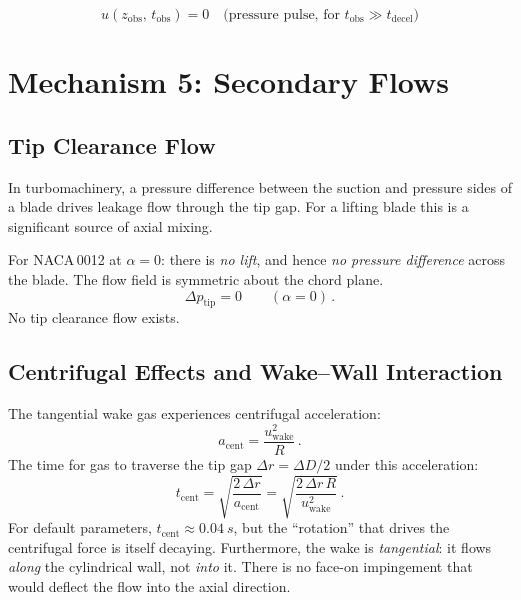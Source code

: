 \documentclass[11pt,a4paper]{article}
\begin{document}
\begin{equation}
  \boxed{u(z_\mathrm{obs},\, t_\mathrm{obs})
    = 0 \quad \text{(pressure pulse, for }
    t_\mathrm{obs} \gg t_\mathrm{decel}\text{)}}
\end{equation}


\section{Mechanism 5: Secondary Flows}
\label{sec:secondary}

\subsection{Tip Clearance Flow}

In turbomachinery, a pressure difference between the suction and
pressure sides of a blade drives leakage flow through the tip gap. For
a lifting blade this is a significant source of axial mixing.

For NACA\,0012 at $\alpha = 0$: there is \emph{no lift}, and hence
\emph{no pressure difference} across the blade. The flow field is
symmetric about the chord plane.
\begin{equation}
  \Delta p_\mathrm{tip} = 0 \qquad (\alpha = 0)\,.
\end{equation}
No tip clearance flow exists.

\subsection{Centrifugal Effects and Wake--Wall Interaction}

The tangential wake gas experiences centrifugal acceleration:
\begin{equation}
  a_\mathrm{cent} = \frac{u_\mathrm{wake}^2}{R}\,.
  \label{eq:acent}
\end{equation}
The time for gas to traverse the tip gap
$\Delta r = \Delta D / 2$ under this acceleration:
\begin{equation}
  t_\mathrm{cent} = \sqrt{\frac{2\,\Delta r}{a_\mathrm{cent}}}
                   = \sqrt{\frac{2\,\Delta r\, R}{u_\mathrm{wake}^2}}\,.
  \label{eq:tcent}
\end{equation}
For default parameters, $t_\mathrm{cent} \approx \SI{0.04}{s}$, but the
``rotation'' that drives the
centrifugal force is itself decaying. Furthermore, the wake is
\emph{tangential}: it flows \emph{along} the cylindrical wall, not
\emph{into} it. There is no face-on impingement that would deflect
the flow into the axial direction.
\end{document}
